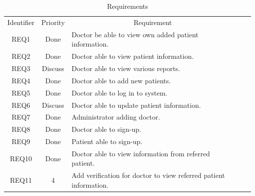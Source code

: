 \documentclass[a4paper]{article}
\begin{document}
\FloatBarrier

\begin{table}[h!]
\centering
\caption*{Requirements}
\label{ReqTable}
\begin{tabular}{lllll}
\cline{1-3}

\multicolumn{1}{|c|}{Identifier} & \multicolumn{1}{c|}{Priority} & \multicolumn{1}{c|}{Requirement} &  &  \\ \cline{1-3}

\multicolumn{1}{|c|}{REQ1} & \multicolumn{1}{c|}{Done} & \multicolumn{1}{l|}{Doctor be able to view own added patient information.} &  &  \\

\multicolumn{1}{|c|}{REQ2} & \multicolumn{1}{c|}{Done} & \multicolumn{1}{l|}{Doctor able to view patient information.} &  &  \\

\multicolumn{1}{|c|}{REQ3} & \multicolumn{1}{c|}{Discuss} & \multicolumn{1}{l|}{Doctor able to view various reports.} &  &  \\

\multicolumn{1}{|c|}{REQ4} & \multicolumn{1}{c|}{Done} & \multicolumn{1}{l|}{Doctor able to add new patients.} &  &  \\

\multicolumn{1}{|c|}{REQ5} & \multicolumn{1}{c|}{Done} & \multicolumn{1}{l|}{Doctor able to log in to system.} &  &  \\

\multicolumn{1}{|c|}{REQ6} & \multicolumn{1}{c|}{Discuss} & \multicolumn{1}{l|}{Doctor able to update patient information.} &  &  \\

\multicolumn{1}{|c|}{REQ7} & \multicolumn{1}{c|}{Done} & \multicolumn{1}{l|}{Administrator adding doctor.} &  &  \\

\multicolumn{1}{|c|}{REQ8} & \multicolumn{1}{c|}{Done} & \multicolumn{1}{l|}{Doctor able to sign-up.} &  &  \\

\multicolumn{1}{|c|}{REQ9} & \multicolumn{1}{c|}{Done} & \multicolumn{1}{l|}{Patient able to sign-up.} &  &  \\

\multicolumn{1}{|c|}{REQ10} & \multicolumn{1}{c|}{Done} & \multicolumn{1}{l|}{Doctor able to view information from referred patient.} &  &  \\

\multicolumn{1}{|c|}{REQ11} & \multicolumn{1}{c|}{4} & \multicolumn{1}{l|}{Add verification for doctor to view referred patient information.} &  &  \\


\end{tabular}
\end{table}
\end{document}
